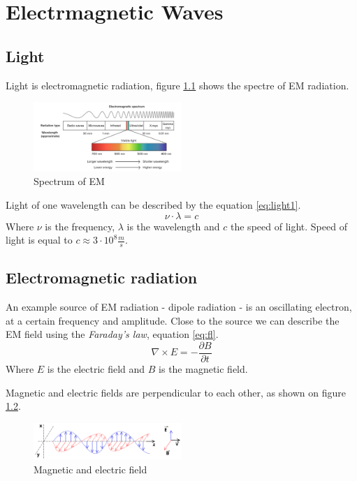 \chapter{Electrmagnetic Waves}

\section{Light}
Light is electromagnetic radiation, figure \ref{fig:spectrum} shows the 
spectre of EM radiation. 

\begin{figure}[h!]
    \centering
    \includegraphics[width=0.5\textwidth]{slike/spectrum.png}
    \caption{Spectrum of EM}
    \label{fig:spectrum}
\end{figure}

Light of one wavelength can be described by the equation \ref{eq:light1}.
\begin{equation}
    \nu \cdot \lambda = c
    \label{eq:light1}
\end{equation}
Where $\nu$ is the frequency, $\lambda$ is the wavelength and $c$ the speed of
light. 
Speed of light is equal to $c \approx 3 \cdot 10^8 \frac{m}{s}$.

\section{Electromagnetic radiation}
An example source of EM radiation - dipole radiation -  is an oscillating electron, at a certain frequency and amplitude.
Close to the source we can describe the EM field using the \textit{Faraday's law}, equation \ref{eq:fl}.
\begin{equation}
    \nabla \times E  = - \frac{\partial B}{\partial t}
    \label{eq:fl}
\end{equation}
Where $E$ is the electric field and $B$ is the magnetic field.

Magnetic and electric fields are perpendicular to each other, as shown on figure \ref{fig:mef}.
\begin{figure}[h!]
    \centering
    \includegraphics[width=0.5\textwidth]{slike/Onde_electromagnetique.svg.png}
    \caption{Magnetic and electric field}
    \label{fig:mef}
\end{figure}

